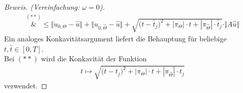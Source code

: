 \begin{proof}[Beweis. (Vereinfachung: $\omega=0$)]
\begin{align*}
		\overset{(\ast\ast)}&\leq
		\big\Vert u_{0,\Theta}-\hat{u}\big\Vert+\big\Vert u_{0,\hat{\Theta}}-\hat{u}\big\Vert
		+\sqrt{\big(t-\hat{t}_j\big)^2+|\pi_\Theta|\cdot t+|\pi_{\hat{\Theta}}|\cdot\hat{t}_j}\cdot\Vert A\hat{u}\Vert
	\end{align*}
	Ein analoges Konkavitätsargument liefert die Behauptung für beliebige $t,\hat{t}\in[0,T]$.\\
	Bei $(\ast\ast)$ wird die Konkavität der Funktion 
	\begin{align*}
		t\mapsto\sqrt{\big(t-t_j)^2+|\pi_\Theta|\cdot t+|\pi_{\hat{\Theta}}|\cdot\hat{t}_j}
	\end{align*}
	verwendet.
\end{proof}